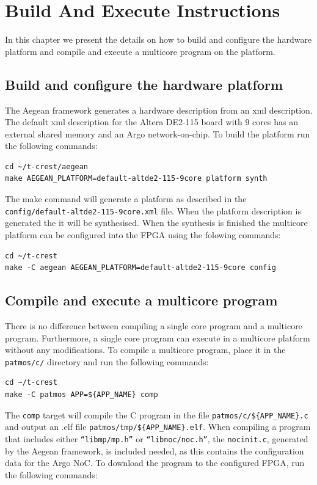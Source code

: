 \documentclass[a4paper,fontsize=10pt,twoside,DIV15,BCOR12mm,headinclude=true,footinclude=false,pagesize,bibtotoc]{scrbook}
\newcommand{\code}[1]{{\texttt{#1}}}
\begin{document}
\chapter{Build And Execute Instructions}
\label{apx:build}

In this chapter we present the details on how to 
build and configure the hardware platform and compile and execute 
a multicore program on the platform.

\section{Build and configure the hardware platform}
\label{apx:buildhw}

The Aegean framework generates a hardware description from an
xml description.
The default xml description for the Altera DE2-115 board with 9 cores
has an external shared memory and an Argo network-on-chip.
To build the platform run the following commands:
\begin{Verbatim}
cd ~/t-crest/aegean
make AEGEAN_PLATFORM=default-altde2-115-9core platform synth
\end{Verbatim}
The make command will generate a platform as described in the
\code{config/default-altde2-115-9core.xml} file.
When the platform description is generated the it will be synthesised.
When the synthesis is finished the multicore platform can be
configured into the FPGA using the folowing commands:
\begin{Verbatim}
cd ~/t-crest
make -C aegean AEGEAN_PLATFORM=default-altde2-115-9core config
\end{Verbatim}

\section{Compile and execute a multicore program}
\label{apx:buildsw}

There is no difference between compiling a single core program and a multicore program.
Furthermore, a single core program can execute in a multicore
platform without any modifications.
To compile a multicore program, place it in the \code{patmos/c/} directory
and run the following commands:

\begin{Verbatim}
cd ~/t-crest
make -C patmos APP=${APP_NAME} comp
\end{Verbatim}

The \code{comp} target will compile the C program in the file \code{patmos/c/\$\{APP\_NAME\}.c}
and output an .elf file \code{patmos/tmp/\$\{APP\_NAME\}.elf}.
When compiling a program that includes either \code{``libmp/mp.h''} or \code{``libnoc/noc.h''},
the \code{nocinit.c}, generated by the Aegean framework, is included needed,
as this contains the configuration data for the Argo NoC.
To download the program to the configured FPGA, run the following commands:
\end{document}
